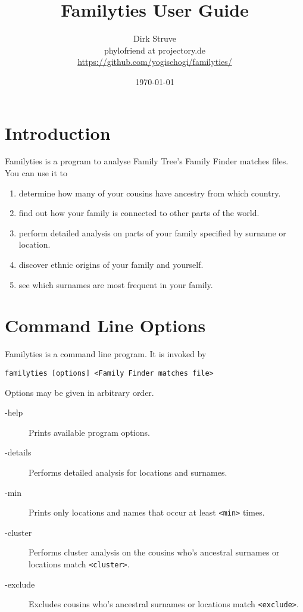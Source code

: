 \documentclass[12pt,a4paper]{article}
\begin{document}
\title{Familyties User Guide}
\author{Dirk Struve\\
phylofriend at projectory.de\\
\href{https://github.com/yogischogi/familyties/}{https://github.com/yogischogi/familyties/}}
\date{\today}
\maketitle
\tableofcontents

\section{Introduction}
Familyties is a program to analyse Family Tree's Family Finder
matches files. You can use it to
\begin{enumerate}
\item determine how many of your cousins have ancestry from which
  country.
\item find out how your family is connected to other parts of the
  world.
\item perform detailed analysis on parts of your family specified
  by surname or location.
\item discover ethnic origins of your family and yourself.
\item see which surnames are most frequent in your family.
\end{enumerate}


\section{Command Line Options}

Familyties is a command line program. It is invoked by

\vspace{1em}
\noindent\texttt{familyties [options] <Family Finder matches file>}

\vspace{1em}
\noindent Options may be given in arbitrary order.

\begin{description}
\item[-help] Prints available program options.
\item[-details] Performs detailed analysis for locations
  and surnames.
\item[-min] Prints only locations and names that occur at
  least \texttt{<min>} times.
\item[-cluster] Performs cluster analysis on the cousins
  who's ancestral surnames or locations match \texttt{<cluster>}.
\item[-exclude] Excludes cousins who's ancestral surnames or
  locations match \texttt{<exclude>}. 

\end{description}
\end{document}
